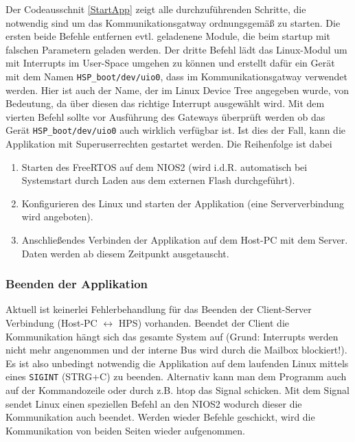Der Codeausschnit \ref{StartApp} zeigt alle durchzuführenden Schritte, die notwendig sind um das Kommunikationsgatway ordnungsgemäß zu starten. Die ersten beide Befehle entfernen evtl. geladenene Module, die beim startup mit falschen Parametern geladen werden. Der dritte Befehl lädt das Linux-Modul um mit Interrupts im User-Space umgehen zu können und erstellt dafür ein Gerät mit dem Namen \texttt{HSP\_boot/dev/uio0}, dass im Kommunikationsgatway verwendet werden. Hier ist auch der Name, der im Linux Device Tree angegeben wurde, von Bedeutung, da über diesen das richtige Interrupt ausgewählt wird. Mit dem vierten Befehl sollte vor Ausführung des Gateways überprüft werden ob das Gerät \texttt{HSP\_boot/dev/uio0} auch wirklich verfügbar ist. Ist dies der Fall, kann die Applikation mit Superuserrechten gestartet werden. Die Reihenfolge ist dabei
\begin{enumerate}
	\item Starten des FreeRTOS auf dem NIOS2 (wird i.d.R. automatisch bei Systemstart durch Laden aus dem externen Flash durchgeführt).
	\item Konfigurieren des Linux und starten der Applikation (eine Serververbindung wird angeboten).
	\item Anschließendes Verbinden der Applikation auf dem Host-PC mit dem Server. Daten werden ab diesem Zeitpunkt ausgetauscht.
\end{enumerate}

\subsubsection{Beenden der Applikation}
Aktuell ist keinerlei Fehlerbehandlung für das Beenden der Client-Server Verbindung (Host-PC $\leftrightarrow$ \ac{HPS}) vorhanden. Beendet der Client die Kommunikation hängt sich das gesamte System auf (Grund: Interrupts werden nicht mehr angenommen und der interne Bus wird durch die Mailbox blockiert!). Es ist also unbedingt notwendig die Applikation auf dem laufenden Linux mittels eines \lstinline|SIGINT| (STRG+C) zu beenden. Alternativ kann man dem Programm auch auf der Kommandozeile oder durch z.B. htop das Signal schicken. Mit dem Signal sendet Linux einen speziellen Befehl an den NIOS2 wodurch dieser die Kommunikation auch beendet. Werden wieder Befehle geschickt, wird die Kommunikation von beiden Seiten wieder aufgenommen.
 